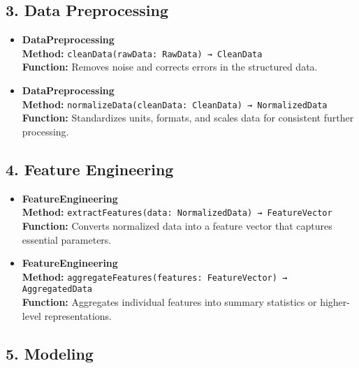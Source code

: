 \documentclass{article}
\begin{document}
\subsection{3. Data Preprocessing}
\begin{itemize}
    \item \textbf{DataPreprocessing} \\
    \textbf{Method:} \verb|cleanData(rawData: RawData) → CleanData| \\
    \textbf{Function:} Removes noise and corrects errors in the structured data.
    
    \item \textbf{DataPreprocessing} \\
    \textbf{Method:} \verb|normalizeData(cleanData: CleanData) → NormalizedData| \\
    \textbf{Function:} Standardizes units, formats, and scales data for consistent further processing.
\end{itemize}

\subsection{4. Feature Engineering}
\begin{itemize}
    \item \textbf{FeatureEngineering} \\
    \textbf{Method:} \verb|extractFeatures(data: NormalizedData) → FeatureVector| \\
    \textbf{Function:} Converts normalized data into a feature vector that captures essential parameters.
    
    \item \textbf{FeatureEngineering} \\
    \textbf{Method:} \verb|aggregateFeatures(features: FeatureVector) → AggregatedData| \\
    \textbf{Function:} Aggregates individual features into summary statistics or higher-level representations.
\end{itemize}

\subsection{5. Modeling}
\end{document}
